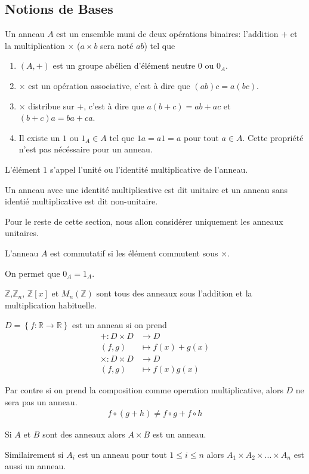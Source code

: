 \subsection{Notions de Bases}
\begin{defn}
\label{def:ring}
Un anneau $A$ est un ensemble muni de deux opérations binaires: l'addition $+$ et la multiplication $\times$ ($a\times b$ sera noté $ab$) tel que
\begin{enumerate}
\item $(A,+)$ est un groupe abélien d'élément neutre $0$ ou $0_A$.
\item $\times$ est un opération associative, c'est à dire que $(ab)c=a(bc)$.
\item $\times$ distribue sur $+$, c'est à dire que $a(b+c)=ab+ac$ et $(b+c)a=ba+ca$.
\item Il existe un $1$ ou $1_A\in A$ tel que $1a=a1=a$ pour tout  $a\in A$. Cette propriété n'est pas nécéssaire pour un anneau.
\end{enumerate}

L'élément $1$ s'appel l'unité ou l'identité multiplicative de l'anneau.

Un anneau avec une identité multiplicative est dit unitaire et un anneau sans identié multiplicative est dit non-unitaire.

Pour le reste de cette section, nous allon considérer uniquement les anneaux unitaires.
\end{defn}

\begin{defn}
\label{def:ring-comut}
L'anneau $A$ est commutatif si les élément commutent sous $\times$. 
\end{defn}

\begin{rmrk}
On permet que $0_A=1_A$.
\end{rmrk}

\begin{ex}
$\mathbb{Z}$,$\mathbb{Z}_n$, $\mathbb{Z}[x]$ et $M_n\left(\mathbb{Z}\right)$ sont tous des anneaux sous l'addition et la multiplication habituelle.

$D=\left\{ f:\mathbb{R}\rightarrow\mathbb{R}\right\}$ est un anneau si on prend
\begin{align*}
+:D\times D&\rightarrow D\\
(f,g)&\mapsto f(x)+g(x)\\
\times:D\times D&\rightarrow D\\
(f,g)&\mapsto f(x)g(x)
\end{align*}

Par contre si on prend la composition comme operation multiplicative, alors $D$ ne sera pas un anneau.
\begin{align*}
f\circ(g+h)\neq f\circ g+f\circ h
\end{align*}

Si $A$ et $B$ sont des anneaux alors $A\times B$ est un anneau.

Similairement si $A_i$ est un anneau pour tout $1\leq i\leq n$ alors $A_1\times A_2\times...\times A_n$ est aussi un anneau.
\end{ex}

